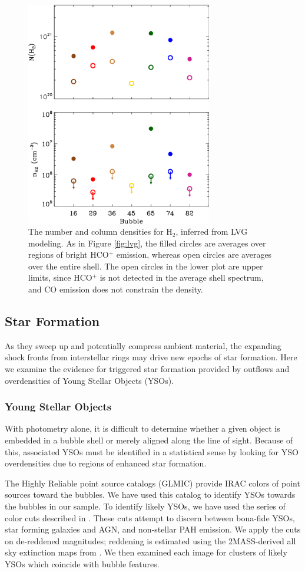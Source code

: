 \begin{figure}
\includegraphics[width=3.2in, angle=00]{bubbles}
\caption{The number and column densities for H$_2$, inferred from LVG modeling. As in Figure \ref{fig:lvg}, the filled circles are averages
over regions of bright HCO$^+$ emission, whereas open circles are averages over the entire shell. The open circles in the lower plot are upper limits, since
HCO$^+$ is not detected in the average shell spectrum, and CO emission does not constrain the density.}
\label{fig:bubbles}
\end{figure}


\subsection{Star Formation}
As they sweep up and potentially compress ambient material,
the expanding shock fronts from interstellar rings may drive
new epochs of star formation. Here we examine the evidence for triggered
star formation provided by outflows and overdensities of Young Stellar Objects
(YSOs).

\subsubsection{Young Stellar Objects}
\label{sec:yso}
With photometry alone, it is difficult to determine whether a given object
is embedded in a bubble shell or merely aligned along the line of sight.
Because of this, associated YSOs must be identified in a statistical sense
by looking for YSO overdensities due to regions of enhanced star formation.

The \glimpse Highly Reliable point source catalogs (GLMIC) provide IRAC colors of
point sources toward the bubbles. We have used this catalog to identify
YSOs towards the bubbles in our sample.
To identify likely YSOs, we have used the series of color cuts described
in . These cuts attempt to discern between bona-fide
YSOs, star forming galaxies and AGN, and non-stellar PAH emission. We apply the cuts
on de-reddened magnitudes; reddening is estimated using the
2MASS-derived all sky extinction maps from .
We then examined each image for clusters of likely YSOs which coincide with bubble features.

